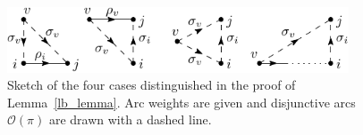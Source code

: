 \documentclass[a4paper]{article}
\theoremstyle{definition}
\theoremstyle{plain}
\newtheorem{proposition}{Proposition}
\begin{document}
\begin{figure}
  \centering
  \includegraphics[width=0.9\textwidth]{figures/single/lower-bound-lemma.pdf}
  \caption{Sketch of the four cases distinguished in the proof of
    Lemma~\ref{lb_lemma}. Arc weights are given and disjunctive arcs
    $\mathcal{O}(\pi)$ are drawn with a dashed line.}\label{fig:lb_lemma}
\end{figure}


\end{document}
